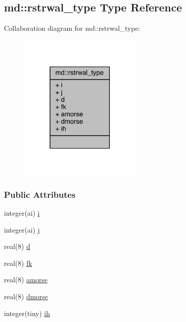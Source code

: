 \hypertarget{structmd_1_1rstrwal__type}{\subsection{md\-:\-:rstrwal\-\_\-type Type Reference}
\label{structmd_1_1rstrwal__type}
}


Collaboration diagram for md\-:\-:rstrwal\-\_\-type\-:
\nopagebreak
\begin{figure}[H]
\begin{center}
\leavevmode
\includegraphics[width=170pt]{structmd_1_1rstrwal__type__coll__graph}
\end{center}
\end{figure}
\subsubsection*{Public Attributes}
\begin{DoxyCompactItemize}
\item 
integer(ai) \hyperlink{structmd_1_1rstrwal__type_a5e11f9213df5922386a41f1211686a6d}{i}
\item 
integer(ai) \hyperlink{structmd_1_1rstrwal__type_a5c975c9f2767cc314b21ca950d772a21}{j}
\item 
real(8) \hyperlink{structmd_1_1rstrwal__type_a75dd6532257d884732247a1069982074}{d}
\item 
real(8) \hyperlink{structmd_1_1rstrwal__type_a2c30c3cad49818d29a316d190d9a31c4}{fk}
\item 
real(8) \hyperlink{structmd_1_1rstrwal__type_a5963863d1de8cb07e064144abdd8610b}{amorse}
\item 
real(8) \hyperlink{structmd_1_1rstrwal__type_a2df4ba5631c1dd5ce15fe3fba79a6bcb}{dmorse}
\item 
integer(tiny) \hyperlink{structmd_1_1rstrwal__type_a81a6abbcf02e2b7ad1088a2c369bc157}{ih}
\end{DoxyCompactItemize}


